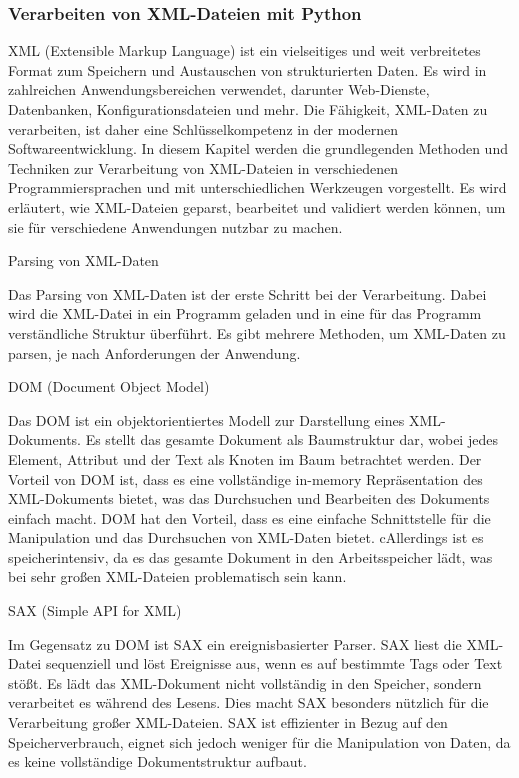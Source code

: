\subsubsection{Verarbeiten von XML-Dateien mit Python}
XML (Extensible Markup Language) ist ein vielseitiges und weit verbreitetes Format zum Speichern und Austauschen von strukturierten Daten.
Es wird in zahlreichen Anwendungsbereichen verwendet, darunter Web-Dienste, Datenbanken, Konfigurationsdateien und mehr.
Die Fähigkeit, XML-Daten zu verarbeiten, ist daher eine Schlüsselkompetenz in der modernen Softwareentwicklung.
In diesem Kapitel werden die grundlegenden Methoden und Techniken zur Verarbeitung von XML-Dateien in verschiedenen Programmiersprachen und mit unterschiedlichen Werkzeugen vorgestellt.
Es wird erläutert, wie XML-Dateien geparst, bearbeitet und validiert werden können, um sie für verschiedene Anwendungen nutzbar zu machen.

Parsing von XML-Daten

Das Parsing von XML-Daten ist der erste Schritt bei der Verarbeitung.
Dabei wird die XML-Datei in ein Programm geladen und in eine für das Programm verständliche Struktur überführt.
Es gibt mehrere Methoden, um XML-Daten zu parsen, je nach Anforderungen der Anwendung.

DOM (Document Object Model)

Das DOM ist ein objektorientiertes Modell zur Darstellung eines XML-Dokuments.
Es stellt das gesamte Dokument als Baumstruktur dar, wobei jedes Element, Attribut und der Text als Knoten im Baum betrachtet werden.
Der Vorteil von DOM ist, dass es eine vollständige in-memory Repräsentation des XML-Dokuments bietet, was das Durchsuchen und Bearbeiten des Dokuments einfach macht.
DOM hat den Vorteil, dass es eine einfache Schnittstelle für die Manipulation und das Durchsuchen von XML-Daten bietet.
cAllerdings ist es speicherintensiv, da es das gesamte Dokument in den Arbeitsspeicher lädt, was bei sehr großen XML-Dateien problematisch sein kann.

SAX (Simple API for XML)

Im Gegensatz zu DOM ist SAX ein ereignisbasierter Parser.
SAX liest die XML-Datei sequenziell und löst Ereignisse aus, wenn es auf bestimmte Tags oder Text stößt.
Es lädt das XML-Dokument nicht vollständig in den Speicher, sondern verarbeitet es während des Lesens.
Dies macht SAX besonders nützlich für die Verarbeitung großer XML-Dateien.
SAX ist effizienter in Bezug auf den Speicherverbrauch, eignet sich jedoch weniger für die Manipulation von Daten, da es keine vollständige Dokumentstruktur aufbaut.

